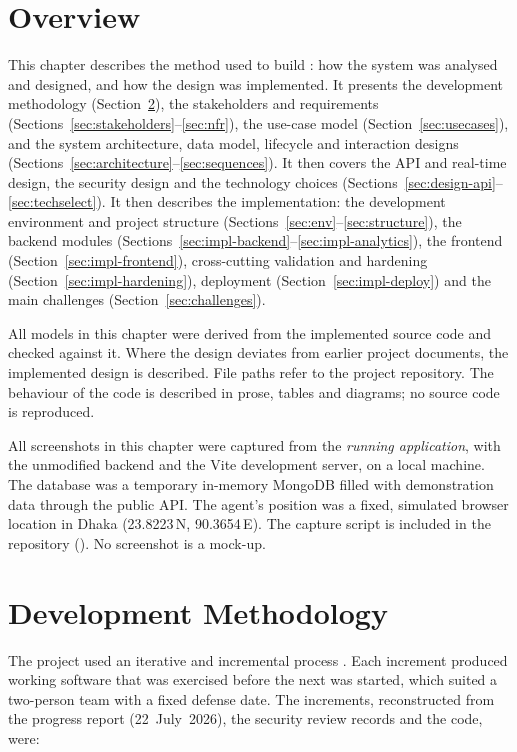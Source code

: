 \section{Overview}

This chapter describes the method used to build \scpms: how the system was analysed and designed, and how the design was implemented. It presents the development methodology (Section~\ref{sec:devmethod}), the stakeholders and requirements (Sections~\ref{sec:stakeholders}--\ref{sec:nfr}), the use-case model (Section~\ref{sec:usecases}), and the system architecture, data model, lifecycle and interaction designs (Sections~\ref{sec:architecture}--\ref{sec:sequences}). It then covers the API and real-time design, the security design and the technology choices (Sections~\ref{sec:design-api}--\ref{sec:techselect}). It then describes the implementation: the development environment and project structure (Sections~\ref{sec:env}--\ref{sec:structure}), the backend modules (Sections~\ref{sec:impl-backend}--\ref{sec:impl-analytics}), the frontend (Section~\ref{sec:impl-frontend}), cross-cutting validation and hardening (Section~\ref{sec:impl-hardening}), deployment (Section~\ref{sec:impl-deploy}) and the main challenges (Section~\ref{sec:challenges}).

All models in this chapter were derived from the implemented source code and checked against it. Where the design deviates from earlier project documents, the implemented design is described. File paths refer to the project repository. The behaviour of the code is described in prose, tables and diagrams; no source code is reproduced.

All screenshots in this chapter were captured from the \emph{running application}, with the unmodified backend and the Vite development server, on a local machine. The database was a temporary in-memory MongoDB filled with demonstration data through the public API. The agent's position was a fixed, simulated browser location in Dhaka (23.8223\,N, 90.3654\,E). The capture script is included in the repository (). No screenshot is a mock-up.

\section{Development Methodology}
\label{sec:devmethod}

The project used an iterative and incremental process \cite{larman2003iterative,pressman2020se}. Each increment produced working software that was exercised before the next was started, which suited a two-person team with a fixed defense date. The increments, reconstructed from the progress report (22~July~2026), the security review records and the code, were:

